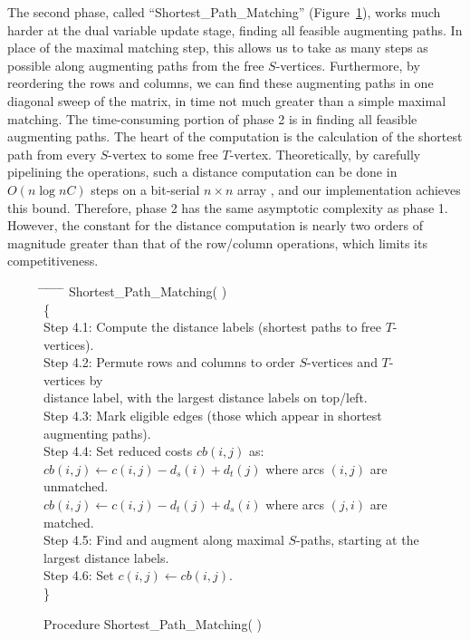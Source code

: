 The second phase, called ``Shortest\_Path\_Matching''
(Figure~\ref{shortest_path_matching}), works much 
harder at the dual variable update stage, finding all feasible 
augmenting paths.  In place of the maximal matching step, this allows us to 
take as many steps as possible along augmenting paths from the free 
$S$-vertices.  Furthermore, by reordering the rows and columns, we can 
find these augmenting paths in one diagonal sweep of the matrix, in 
time not much greater than a simple maximal matching.  The 
time-consuming portion of phase 2 is in finding all feasible 
augmenting paths.  The heart of the computation is the calculation of 
the shortest path from every $S$-vertex to some free $T$-vertex.  
Theoretically, by carefully pipelining the operations, such a 
distance computation can be done in $O(n \log n C)$ steps on a 
bit-serial $n \times n$ array \cite{va80}, and our implementation 
achieves this bound.  Therefore, phase 2 has the same asymptotic 
complexity as phase 1.  However, the constant for the distance 
computation is nearly two orders of magnitude greater than that 
of the row/column operations, which limits its competitiveness.

\begin{figure}
\begin{tabbing}
\hspace*{.25in} \= \hspace*{.25in} \= \hspace*{.25in} \= \hspace*{.25in} \= \hspace*{.25in} \= \hspace*{.25in} \=  \kill
Shortest\_Path\_Matching( ) \\
\{ \\
\> Step 4.1: \> \> \> Compute the distance labels (shortest paths to free $T$-vertices). \\
\> Step 4.2: \> \> \> Permute rows and columns to order $S$-vertices and $T$-vertices by  \\
\> \> \> \> 	  distance label, with the largest distance labels on top/left. \\
\> Step 4.3: \> \> \> Mark eligible edges (those which appear in shortest augmenting paths). \\
\> Step 4.4: \> \> \> Set reduced costs $cb(i, j)$ as: \\ 
\> \> \> \> $cb(i, j) \leftarrow c(i, j) - d_s(i) + d_t(j)$ where arcs $(i, j)$ are unmatched. \\
\> \> \> \> $cb(i, j) \leftarrow c(i, j) - d_t(j) + d_s(i)$ where arcs $(j, i)$ are matched. \\ 
\> Step 4.5: \> \> \> Find and augment along maximal $S$-paths, starting at the largest distance labels. \\
\> Step 4.6: \> \> \> Set $c(i, j) \leftarrow cb(i, j).$ \\
\} \\
\end{tabbing}
\caption{Procedure Shortest\_Path\_Matching( )}
\label{shortest_path_matching}
\end{figure}

